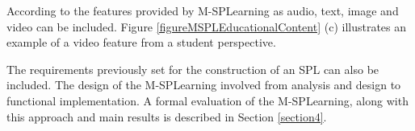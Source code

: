 According to the features provided by M-SPLearning as audio, text, image and video can be included. %
Figure \ref{figureMSPLEducationalContent} (c) illustrates an example of a video feature from a student perspective.

The requirements previously set for the construction of an SPL can also be included. The design of the M-SPLearning involved from analysis and design to functional implementation. A formal evaluation of the M-SPLearning, along with this approach and main results is described in Section \ref{section4}.